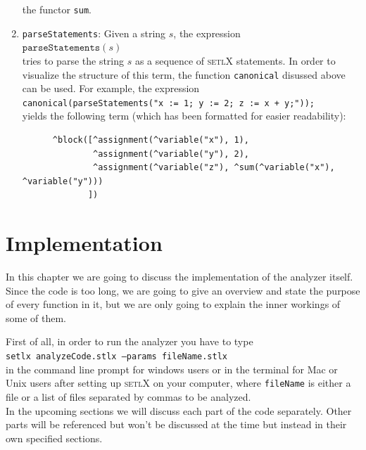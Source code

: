 \documentclass[11pt]{report}
\begin{document}
\begin{enumerate}
      the functor \texttt{sum}.
\item \texttt{parseStatements}:  Given a string $s$, the expression
      \\[0.2cm]
      \hspace*{1.3cm}
      $\mathtt{parseStatements}(s)$ 
      \\[0.2cm]
      tries to parse the string $s$ as a sequence of \textsc{setlX} statements.   In order to visualize the structure of
      this term,  the function \texttt{canonical} disussed above can be used.  For
      example, the expression
      \\[0.2cm]
      \hspace*{1.3cm}
      \texttt{canonical(parseStatements("x := 1; y := 2; z := x + y;"));}
      \\[0.2cm]
      yields the following term (which has been formatted for easier readability):
\begin{verbatim}
      ^block([^assignment(^variable("x"), 1), 
              ^assignment(^variable("y"), 2), 
              ^assignment(^variable("z"), ^sum(^variable("x"), ^variable("y")))
             ])
\end{verbatim}
\end{enumerate}

\chapter{Implementation}

In this chapter we are going to discuss the implementation of the analyzer itself. Since the code is too long, we are going to give an overview and state the purpose of every function in it, but we are only going to explain the inner workings of some of them. 

First of all, in order to run the analyzer you have to type
\\[0.2cm]
\hspace*{1.3cm}
\texttt{setlx analyzeCode.stlx --params fileName.stlx}
\\[0.2cm]
in the command line prompt for windows users or in the terminal for Mac or Unix users after setting up \textsc{setlX} on your computer, where \texttt{fileName} is either a file or a list of files separated by commas to be analyzed.
\\

In the upcoming sections we will discuss each part of the code separately. Other parts will be referenced but won't be discussed at the time but instead in their own specified sections.
\end{document}
